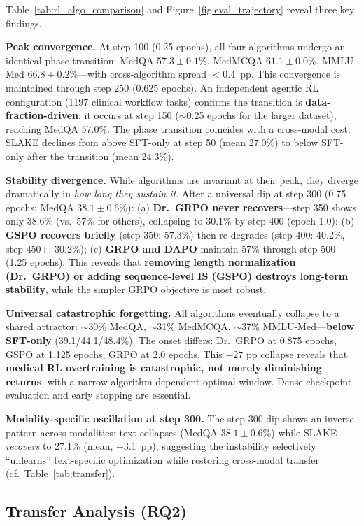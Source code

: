 \documentclass{article}
\begin{document}
Table~\ref{tab:rl_algo_comparison} and Figure~\ref{fig:eval_trajectory} reveal three key findings.

\textbf{Peak convergence.} At step 100 (0.25 epochs), all four algorithms undergo an identical phase transition: MedQA $57.3{\pm}0.1$\%, MedMCQA $61.1{\pm}0.0$\%, MMLU-Med $66.8{\pm}0.2$\%---with cross-algorithm spread $<$0.4~pp. This convergence is maintained through step 250 (0.625 epochs). An independent agentic RL configuration (1197 clinical workflow tasks) confirms the transition is \textbf{data-fraction-driven}: it occurs at step 150 (${\sim}$0.25 epochs for the larger dataset), reaching MedQA 57.0\%. The phase transition coincides with a cross-modal cost: SLAKE declines from above SFT-only at step 50 (mean 27.0\%) to below SFT-only after the transition (mean 24.3\%).

\textbf{Stability divergence.} While algorithms are invariant at their peak, they diverge dramatically in \emph{how long they sustain it}. After a universal dip at step 300 (0.75 epochs; MedQA $38.1{\pm}0.6$\%): (a) \textbf{Dr.~GRPO never recovers}---step 350 shows only 38.6\% (vs.\ 57\% for others), collapsing to 30.1\% by step 400 (epoch 1.0); (b) \textbf{GSPO recovers briefly} (step 350: 57.3\%) then re-degrades (step 400: 40.2\%, step 450+: 30.2\%); (c) \textbf{GRPO and DAPO} maintain 57\% through step 500 (1.25 epochs). This reveals that \textbf{removing length normalization (Dr.~GRPO) or adding sequence-level IS (GSPO) destroys long-term stability}, while the simpler GRPO objective is most robust.

\textbf{Universal catastrophic forgetting.} All algorithms eventually collapse to a shared attractor: ${\sim}$30\% MedQA, ${\sim}$31\% MedMCQA, ${\sim}$37\% MMLU-Med---\textbf{below SFT-only} (39.1/44.1/48.4\%). The onset differs: Dr.~GRPO at 0.875 epochs, GSPO at 1.125 epochs, GRPO at 2.0 epochs. This $-27$ pp collapse reveals that \textbf{medical RL overtraining is catastrophic, not merely diminishing returns}, with a narrow algorithm-dependent optimal window. Dense checkpoint evaluation and early stopping are essential.

\textbf{Modality-specific oscillation at step 300.} The step-300 dip shows an inverse pattern across modalities: text collapses (MedQA $38.1{\pm}0.6$\%) while SLAKE \emph{recovers} to 27.1\% (mean, +3.1~pp), suggesting the instability selectively ``unlearns'' text-specific optimization while restoring cross-modal transfer (cf.\ Table~\ref{tab:transfer}).

\subsection{Transfer Analysis (RQ2)}
\end{document}
